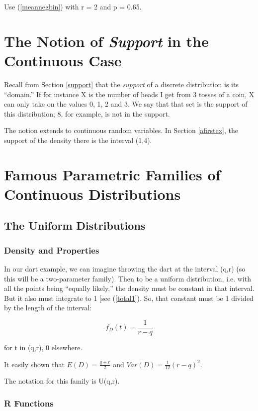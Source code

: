 Use (\ref{meannegbin}) with r = 2 and p = 0.65.

\section{The Notion of {\it Support} in the Continuous Case}
\label{continsupport}

Recall from Section \ref{support} that the {\it support} of a discrete
distribution is its ``domain.''  If for instance X is the number of
heads I get from 3 tosses of a coin, X can only take on the values 0, 1,
2 and 3.  We say that that set is the support of this distribution; 8,
for example, is not in the support.

The notion extends to continuous random variables.  In Section
\ref{afirstex}, the support of the density there is the interval (1,4).

\section{Famous Parametric Families of Continuous Distributions}

\subsection{The Uniform Distributions}

\subsubsection{Density and Properties}
\label{unifprops} 

In our dart example, we can imagine throwing the dart at the interval
(q,r) (so this will be a two-parameter family).  Then to be a uniform
distribution, i.e. with all the points being ``equally likely,'' the
density must be constant in that interval.  But it also must integrate
to 1 [see (\ref{total1}).  So, that constant must be 1 divided by the
length of the interval:

\begin{equation}
f_D(t) = \frac{1}{r-q} 
\end{equation}

for t in (q,r), 0 elsewhere.  

It easily shown that $E(D) = \frac{q+r}{2}$ and $Var(D) = \frac{1}{12} (r-q)^2$.

The notation for this family is U(q,r).

\subsubsection{R Functions}

